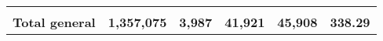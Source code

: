 \begin{tabular}{lrcclr}
	& \multicolumn{1}{l}{}                                           & \multicolumn{1}{l}{}                                       & \multicolumn{1}{l}{} &                                                                     & \multicolumn{1}{l}{}                                                         \\
	\rowcolor[HTML]{DDEBF7} 
	\textbf{Total   general}                                       & \textbf{1,357,075}                                             & \multicolumn{1}{r}{\cellcolor[HTML]{DDEBF7}\textbf{3,987}} & \textbf{41,921}      & \textbf{45,908}                                                     & \textbf{338.29}                                                             
\end{tabular}